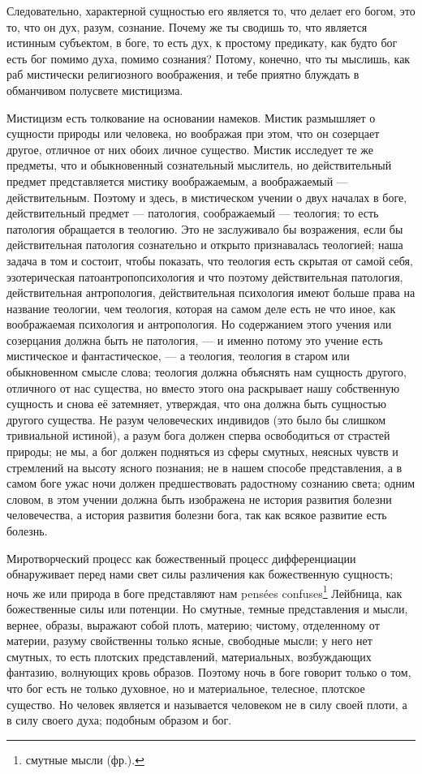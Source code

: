 \documentclass[12pt,oneside]{book}
\begin{document}
Следовательно, характерной сущностью его является то, что делает его богом, это то, что он дух, разум, сознание. Почему же ты сводишь то, что является истинным субъектом, в боге, то есть дух, к простому предикату, как будто бог есть бог помимо духа, помимо сознания? Потому, конечно, что ты мыслишь, как раб мистически религиозного воображения, и тебе приятно блуждать в обманчивом полусвете мистицизма.

Мистицизм есть толкование на основании намеков. Мистик размышляет о сущности природы или человека, но воображая при этом, что он созерцает другое, отличное от них обоих личное существо. Мистик исследует те же предметы, что и обыкновенный сознательный мыслитель, но действительный предмет представляется мистику воображаемым, а воображаемый --- действительным. Поэтому и здесь, в мистическом учении о двух началах в боге, действительный предмет --- патология, соображаемый --- теология; то есть патология обращается в теологию. Это не заслуживало бы возражения, если бы действительная патология сознательно и открыто признавалась теологией; наша задача в том и состоит, чтобы показать, что теология есть скрытая от самой себя, эзотерическая патоантропопсихология и что поэтому действительная патология, действительная антропология, действительная психология имеют больше права на название теологии, чем теология, которая на самом деле есть не что иное, как воображаемая психология и антропология. Но содержанием этого учения или созерцания должна быть не патология, --- и именно потому это учение есть мистическое и фантастическое, --- а теология, теология в старом или обыкновенном смысле слова; теология должна объяснять нам сущность другого, отличного от нас существа, но вместо этого она раскрывает нашу собственную сущность и снова её затемняет, утверждая, что она должна быть сущностью другого существа. Не разум человеческих индивидов (это было бы слишком тривиальной истиной), а разум бога должен сперва освободиться от страстей природы; не мы, а бог должен подняться из сферы смутных, неясных чувств и стремлений на высоту ясного познания; не в нашем способе представления, а в самом боге ужас ночи должен предшествовать радостному сознанию света; одним словом, в этом учении должна быть изображена не история развития болезни человечества, а история развития болезни бога, так как всякое развитие есть болезнь.

Миротворческий процесс как божественный процесс дифференциации обнаруживает перед нами свет силы различения как божественную сущность; ночь же или природа в боге представляют нам pens\'ees confuses\footnote{смутные мысли (фр.).} Лейбница, как божественные силы или потенции. Но смутные, темные представления и мысли, вернее, образы, выражают собой плоть, материю; чистому, отделенному от материи, разуму свойственны только ясные, свободные мысли; у него нет смутных, то есть плотских представлений, материальных, возбуждающих фантазию, волнующих кровь образов. Поэтому ночь в боге говорит только о том, что бог есть не только духовное, но и материальное, телесное, плотское существо. Но человек является и называется человеком не в силу своей плоти, а в силу своего духа; подобным образом и бог.
\end{document}
